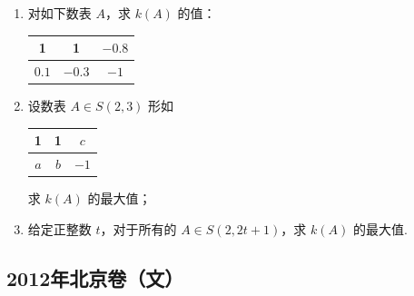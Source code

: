 \begin{description}
\begin{enumerate}[leftmargin=5pt]
\begin{enumerate}
\item 对如下数表 \(A\)，求 \(k(A)\) 的值：

\begin{center}
\renewcommand{\arraystretch}{1.2}
\begin{tabular}{|c|c|c|}
\hline
1 & 1 & \(-0.8\) \\
\hline
\(0.1\) & \(-0.3\) & \(-1\) \\
\hline
\end{tabular}
\end{center}

\item 设数表 \(A\in S(2,3)\) 形如

\begin{center}
\renewcommand{\arraystretch}{1.2}
\begin{tabular}{|c|c|c|}
\hline
1 & 1 & \(c\) \\
\hline
\(a\) & \(b\) & \(-1\) \\
\hline
\end{tabular}
\end{center}

求 \(k(A)\) 的最大值；
\item 给定正整数 \(t\)，对于所有的 \(A\in S(2,2t+1)\)，求 \(k(A)\) 的最大值.
\end{enumerate}

    \end{enumerate}

\end{description}


\subsection{2012年北京卷（文）}\label{gk:2012年北京卷（文）}

